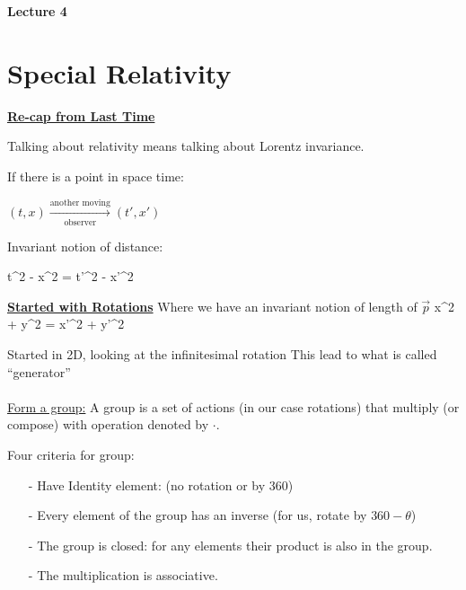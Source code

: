 
\usepackage{fancyhdr}

\fancyhf{}


\thispagestyle{fancy}

\begin{center}
{\huge \textbf{Lecture 4}}
\end{center}

{\fontsize{14}{16}\selectfont


\section*{Special Relativity}

\underline{\textbf{Re-cap from Last Time}}

Talking about relativity means talking about Lorentz invariance.

If there is a point in space time: \\
\begin{center}
$(t,x) \xrightarrow[\text{observer}]{\text{another moving}} (t', x')$
\end{center}

Invariant notion of distance:
 
\be
t^2 - x^2 = t'^2 - x'^2
\ee

\underline{\textbf{Started with Rotations}}
Where we have an invariant notion of length of $\vec{p}$
\be
x^2 + y^2 = x'^2 + y'^2
\ee

Started in 2D, looking at the infinitesimal rotation
This lead to what is called ``generator'' \\

\IMatrix\\

\underline{Form a group:}
A group is a set of actions (in our case rotations) that multiply (or compose) with operation denoted by $\cdot$.

Four criteria for group:
\begin{itemize}
\item[-] Have Identity element:  (no rotation or by 360)
\item[-] Every element of the group has an inverse (for us, rotate by $360-\theta$)
\item[-] The group is closed:  for any elements their product is also in the group.
\item[-] The multiplication is associative.
\end{itemize}

}
